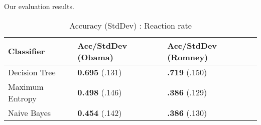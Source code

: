 Our evaluation results.


\begin{table}[H]
\begin{centering}
\begin{tabular}{ l | l | l }
Classifier & Acc/StdDev (Obama) & Acc/StdDev (Romney) \\
\hline
Decision Tree & \textbf{0.695} (.131) & \textbf{.719} (.150) \\
Maximum Entropy & \textbf{0.498} (.146) & \textbf{.386} (.129) \\
Naive Bayes & \textbf{0.454} (.142) & \textbf{.386} (.130) \\
\end{tabular}
\caption{Accuracy (StdDev) : Reaction rate}
\end{centering}
\end{table}
